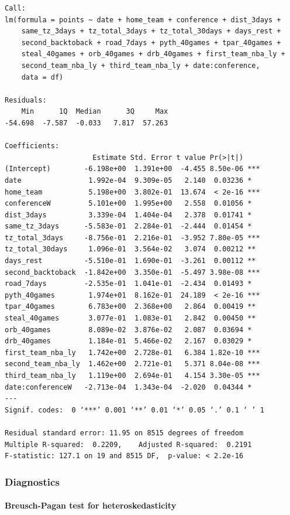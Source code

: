 \documentclass[
    12pt,
    a4paper,
    titlepage,  %
    abstract,  %
    headings=standardclasses,  %
    bibliography=totocnumbered  %
]{scrartcl}
\begin{document}
\begin{Verbatim}
Call:
lm(formula = points ~ date + home_team + conference + dist_3days + 
    same_tz_3days + tz_total_3days + tz_total_30days + days_rest + 
    second_backtoback + road_7days + pyth_40games + tpar_40games + 
    steal_40games + orb_40games + drb_40games + first_team_nba_ly + 
    second_team_nba_ly + third_team_nba_ly + date:conference, 
    data = df)

Residuals:
    Min      1Q  Median      3Q     Max 
-54.698  -7.587  -0.033   7.817  57.263 

Coefficients:
                     Estimate Std. Error t value Pr(>|t|)    
(Intercept)        -6.198e+00  1.391e+00  -4.455 8.50e-06 ***
date                1.992e-04  9.309e-05   2.140  0.03236 *  
home_team           5.198e+00  3.802e-01  13.674  < 2e-16 ***
conferenceW         5.101e+00  1.995e+00   2.558  0.01056 *  
dist_3days          3.339e-04  1.404e-04   2.378  0.01741 *  
same_tz_3days      -5.583e-01  2.284e-01  -2.444  0.01454 *  
tz_total_3days     -8.756e-01  2.216e-01  -3.952 7.80e-05 ***
tz_total_30days     1.096e-01  3.564e-02   3.074  0.00212 ** 
days_rest          -5.510e-01  1.690e-01  -3.261  0.00112 ** 
second_backtoback  -1.842e+00  3.350e-01  -5.497 3.98e-08 ***
road_7days         -2.535e-01  1.041e-01  -2.434  0.01493 *  
pyth_40games        1.974e+01  8.162e-01  24.189  < 2e-16 ***
tpar_40games        6.783e+00  2.368e+00   2.864  0.00419 ** 
steal_40games       3.077e-01  1.083e-01   2.842  0.00450 ** 
orb_40games         8.089e-02  3.876e-02   2.087  0.03694 *  
drb_40games         1.184e-01  5.466e-02   2.167  0.03029 *  
first_team_nba_ly   1.742e+00  2.728e-01   6.384 1.82e-10 ***
second_team_nba_ly  1.462e+00  2.721e-01   5.371 8.04e-08 ***
third_team_nba_ly   1.119e+00  2.694e-01   4.154 3.30e-05 ***
date:conferenceW   -2.713e-04  1.343e-04  -2.020  0.04344 *  
---
Signif. codes:  0 ‘***’ 0.001 ‘**’ 0.01 ‘*’ 0.05 ‘.’ 0.1 ‘ ’ 1

Residual standard error: 11.95 on 8515 degrees of freedom
Multiple R-squared:  0.2209,    Adjusted R-squared:  0.2191 
F-statistic: 127.1 on 19 and 8515 DF,  p-value: < 2.2e-16
\end{Verbatim}

\subsubsection{Diagnostics} \label{diag-code}

\paragraph{Breusch-Pagan test for heteroskedasticity}
\end{document}
